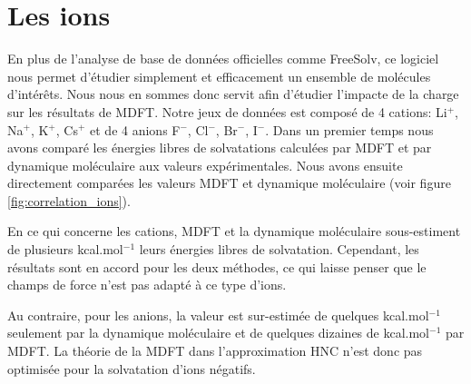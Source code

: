 




\section{Les ions}
En plus de l'analyse de base de données officielles comme FreeSolv, ce logiciel nous permet d'étudier simplement et efficacement un ensemble de molécules d’intérêts. Nous nous en sommes donc servit afin d'étudier l'impacte de la charge sur les résultats de MDFT. Notre jeux de données est composé de 4 cations: Li$^+$, Na$^+$, K$^+$, Cs$^+$ et de 4 anions F$^-$, Cl$^-$, Br$^-$, I$^-$.
Dans un premier temps nous avons comparé les énergies libres de solvatations calculées par MDFT et par dynamique moléculaire\cite{Horinek_rational_2009} aux valeurs expérimentales\cite{Marcus_simple_1994, Noyes_thermodynamics_1962}. Nous avons ensuite directement comparées les valeurs MDFT et dynamique moléculaire (voir figure \ref{fig:correlation_ions}).

En ce qui concerne les cations, MDFT et la dynamique moléculaire sous-estiment de plusieurs kcal.mol$^{-1}$ leurs énergies libres de solvatation. Cependant, les résultats sont en accord pour les deux méthodes, ce qui laisse penser que le champs de force n'est pas adapté à ce type d'ions.

Au contraire, pour les anions, la valeur est sur-estimée de quelques kcal.mol$^{-1}$ seulement par la dynamique moléculaire et de quelques dizaines de kcal.mol$^{-1}$ par MDFT. La théorie de la MDFT dans l'approximation HNC n'est donc pas optimisée pour la solvatation d'ions négatifs. 




